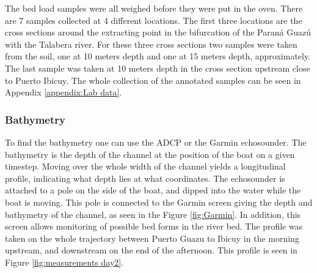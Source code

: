The bed load samples were all weighed before they were put in the oven. There are 7 samples collected at 4 different locations. The first three locations are the cross sections around the extracting point in the bifurcation of the Paraná Guazú with the Talabera river. For these three cross sections two samples were taken from the soil, one at 10 meters depth and one at 15 meters depth, approximately. 
The last sample was taken at 10 meters depth in the cross section upstream close to Puerto Ibicuy. The whole collection of the annotated samples can be seen in Appendix \ref{appendix:Lab data}.

\subsubsection{Bathymetry}
To find the bathymetry one can use the ADCP or the Garmin echosounder. 
The bathymetry is the depth of the channel at the position of the boat on a given timestep. Moving over the whole width of the channel yields a longitudinal profile, indicating what depth lies at what coordinates.
The echosounder is attached to a pole on the side of the boat, and dipped into the water while the boat is moving. This pole is connected to the Garmin screen giving the depth and bathymetry of the channel, as seen in the Figure \ref{fig:Garmin}. In addition, this screen allows monitoring of possible bed forms in the river bed. The profile was taken on the whole trajectory between Puerto Guazu to Ibicuy in the morning upstream, and downstream on the end of the afternoon. This profile is seen in Figure \ref{fig:measurements day2}.

